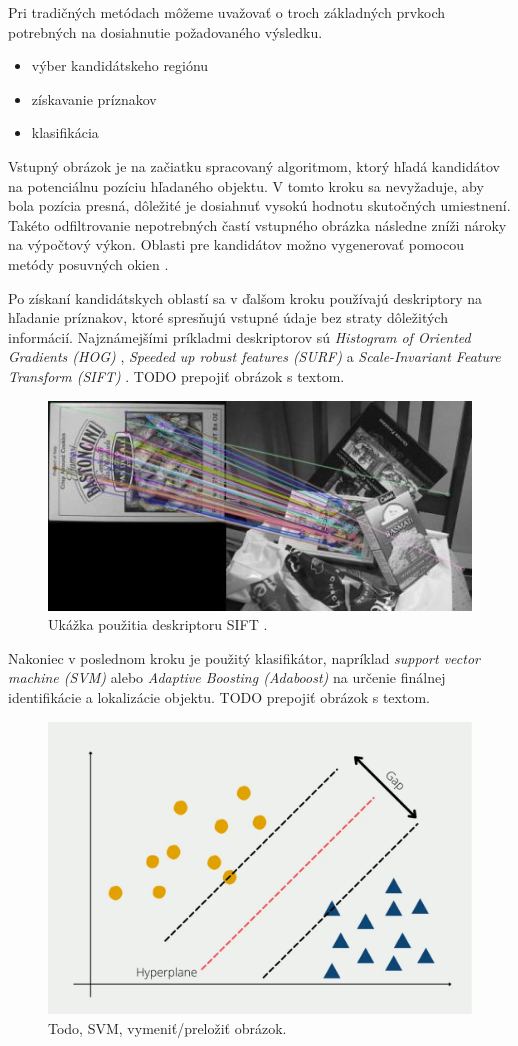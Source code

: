 Pri tradičných metódach môžeme uvažovať o troch základných prvkoch potrebných na dosiahnutie požadovaného výsledku.
\begin{itemize}
    \item výber kandidátskeho regiónu
    \item získavanie príznakov
    \item klasifikácia
\end{itemize}

Vstupný obrázok je na začiatku spracovaný algoritmom, ktorý hľadá kandidátov na potenciálnu pozíciu hľadaného objektu. V tomto kroku sa nevyžaduje, aby bola pozícia presná, dôležité je dosiahnuť vysokú hodnotu skutočných umiestnení. Takéto odfiltrovanie nepotrebných častí vstupného obrázka následne zníži nároky na výpočtový výkon. Oblasti pre kandidátov možno vygenerovať pomocou metódy  posuvných okien \cite{sel-search}.

Po získaní kandidátskych oblastí sa v ďalšom kroku používajú deskriptory na hľadanie príznakov, ktoré spresňujú vstupné údaje bez straty dôležitých informácií. Najznámejšími príkladmi deskriptorov sú \textit{Histogram of Oriented Gradients (HOG)} \cite{HOG}, \textit{Speeded up robust features (SURF)} \cite{SURF} a \textit{Scale-Invariant Feature Transform (SIFT)} \cite{SIFT}.
TODO prepojiť obrázok s textom.
\begin{figure}[H]
    \centering
    \includegraphics[width=.6\textwidth]{images/01/sift.jpeg}
    \caption{Ukážka použitia deskriptoru SIFT \cite{sift-img}.}
    \label{img:sift}
\end{figure}

Nakoniec v poslednom kroku je použitý klasifikátor, napríklad \textit{support vector machine (SVM)} \cite{SVM} alebo \textit{Adaptive Boosting (Adaboost)} \cite{Adaboost} na určenie finálnej identifikácie a lokalizácie objektu.
TODO prepojiť obrázok s textom.
\begin{figure}[H]
    \centering
    \includegraphics[width=.6\textwidth]{images/01/svm.png}
    \caption{Todo, SVM, vymeniť/preložiť obrázok.}
    \label{img:svm}
\end{figure}

